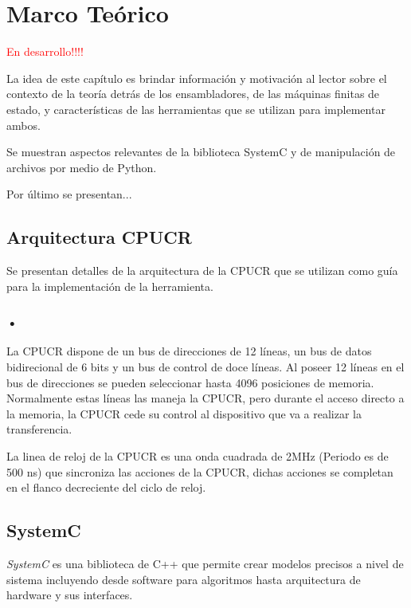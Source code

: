 \chapter{Marco Teórico}%
\textcolor{red}{En desarrollo!!!!}

La idea de este capítulo es brindar información y motivación al lector sobre el contexto de la teoría detrás de los ensambladores, de las máquinas finitas de estado, y características de las herramientas que se utilizan para implementar ambos.

Se muestran aspectos relevantes de la biblioteca SystemC y de manipulación de archivos por medio de Python.

Por último se presentan...

\section{Arquitectura CPUCR}

Se presentan detalles de la arquitectura de la CPUCR que se utilizan como guía para la implementación de la herramienta.

\subsection{•}

La CPUCR dispone de un bus de direcciones de 12 líneas, un bus de datos bidirecional de 6 bits y un bus de control de doce líneas. Al poseer 12 líneas en el bus de direcciones se pueden seleccionar hasta 4096 posiciones de memoria.
Normalmente estas líneas las maneja la CPUCR, pero durante el acceso directo a la memoria, la CPUCR cede su control al dispositivo que va a realizar la transferencia.

La linea de reloj de la CPUCR es una onda cuadrada de 2MHz 
(Periodo es de 500 ns) que sincroniza las acciones de la CPUCR, dichas acciones
se completan en el flanco decreciente del ciclo de reloj.


\section{SystemC}

\textit{SystemC} es una biblioteca de C++ que permite crear modelos precisos a nivel de sistema incluyendo desde software para algoritmos hasta arquitectura de hardware y sus interfaces.
\cite{banerjee2013systemc}

